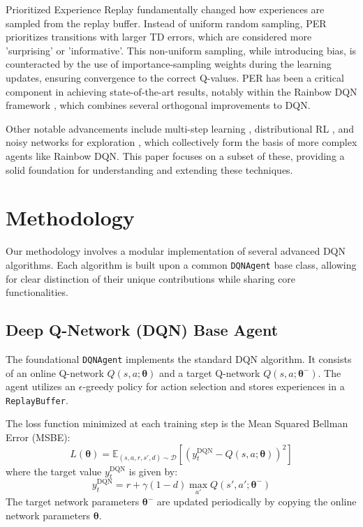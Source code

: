 \documentclass[conference]{IEEEtran}
\newcommand{\thetab}{\boldsymbol{\theta}}
\newcommand{\Qfunc}{Q}
\begin{document}
Prioritized Experience Replay \cite{schaul2015prioritized} fundamentally changed how experiences are sampled from the replay buffer. Instead of uniform random sampling, PER prioritizes transitions with larger TD errors, which are considered more 'surprising' or 'informative'. This non-uniform sampling, while introducing bias, is counteracted by the use of importance-sampling weights during the learning updates, ensuring convergence to the correct Q-values. PER has been a critical component in achieving state-of-the-art results, notably within the Rainbow DQN framework \cite{hessel2018rainbow}, which combines several orthogonal improvements to DQN.

Other notable advancements include multi-step learning \cite{sutton1998reinforcement}, distributional RL \cite{bellemare2017distributional}, and noisy networks for exploration \cite{fortunato2017noisy}, which collectively form the basis of more complex agents like Rainbow DQN. This paper focuses on a subset of these, providing a solid foundation for understanding and extending these techniques.


\section{Methodology}
Our methodology involves a modular implementation of several advanced DQN algorithms. Each algorithm is built upon a common \texttt{DQNAgent} base class, allowing for clear distinction of their unique contributions while sharing core functionalities.

\subsection{Deep Q-Network (DQN) Base Agent}

The foundational \texttt{DQNAgent} implements the standard DQN algorithm. It consists of an online Q-network \(\Qfunc(s, a; \thetab)\) and a target Q-network \(\Qfunc(s, a; \thetab^-)\). The agent utilizes an \(\epsilon\)-greedy policy for action selection and stores experiences in a \texttt{ReplayBuffer}.

The loss function minimized at each training step is the Mean Squared Bellman Error (MSBE):
\begin{equation}
L(\thetab) = \mathbb{E}_{(s,a,r,s',d) \sim \mathcal{D}} \left[ \left( y_t^{\text{DQN}} - Q(s, a; \thetab) \right)^2 \right]
\label{eq:dqn_loss}
\end{equation}
where the target value \(y_t^{\text{DQN}}\) is given by:
\begin{equation}
y_t^{\text{DQN}} = r + \gamma (1 - d) \max_{a'} Q(s', a'; \thetab^-)
\label{eq:dqn_target}
\end{equation}
The target network parameters \(\thetab^-\) are updated periodically by copying the online network parameters \(\thetab\).
\end{document}
